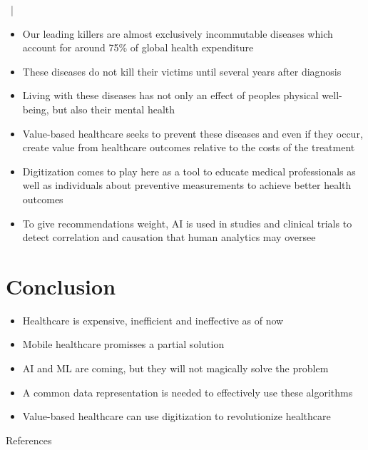 \documentclass[xcolor=dvipsnames, aspectratio=1610]{beamer}
\begin{document}
\begin{frame}{\secname\ | \subsecname}
    \begin{itemize}[<+->]
        \item Our leading killers are almost exclusively incommutable diseases which account for around 75\% of global health expenditure \cite{tsiachristas2016financial}
        \item These diseases do not kill their victims until several years after diagnosis
        \item Living with these diseases has not only an effect of peoples physical well-being, but also their mental health
        \item Value-based healthcare seeks to prevent these diseases and even if they occur, create value from healthcare outcomes relative to the costs of the treatment \cite{putera2017redefining}
        \item Digitization comes to play here as a tool to educate medical professionals as well as individuals about preventive measurements to achieve better health outcomes
        \item To give recommendations weight, AI is used in studies and clinical trials to detect correlation and causation that human analytics may oversee \cite{rehme2014identifying}
    \end{itemize}
\end{frame}


\section{Conclusion}%
\label{sec:conclusion}

\begin{frame}{\secname}
    \begin{itemize}[<+->]
        \item Healthcare is expensive, inefficient and ineffective as of now
        \item Mobile healthcare promisses a partial solution
        \item AI and ML are coming, but they will not magically solve the problem
        \item A common data representation is needed to effectively use these algorithms
        \item Value-based healthcare can use digitization to revolutionize healthcare
    \end{itemize}
\end{frame}


\begin{frame}[allowframebreaks]{References}
    
    
\end{frame}
\end{document}
